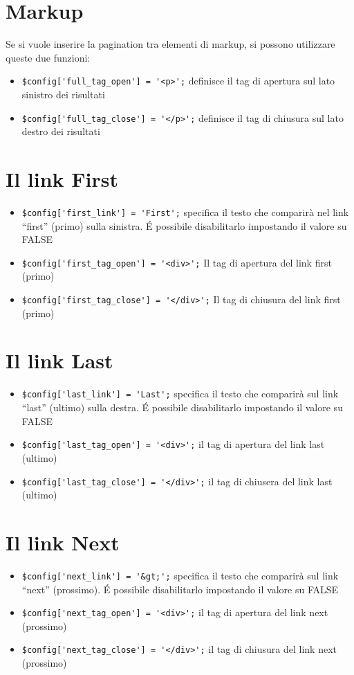 \section*{Markup}
Se si vuole inserire la pagination tra elementi di markup, si possono utilizzare queste due funzioni:

\begin{itemize}
\item \verb|$config['full_tag_open'] = '<p>';| definisce il tag di apertura sul lato sinistro dei risultati
\item \verb|$config['full_tag_close'] = '</p>';| definisce il tag di chiusura sul lato destro dei risultati
\end{itemize}

\section*{Il link First}
\begin{itemize}
\item \verb|$config['first_link'] = 'First';| specifica il testo che comparirà nel link ``first'' (primo) sulla sinistra. \'E possibile disabilitarlo impostando il valore su FALSE
\item \verb|$config['first_tag_open'] = '<div>';| Il tag di apertura del link first (primo)
\item \verb|$config['first_tag_close'] = '</div>';| Il tag di chiusura del link first (primo)
\end{itemize}

\section*{Il link Last}
\begin{itemize}
\item \verb|$config['last_link'] = 'Last';| specifica il testo che comparirà  sul link ``last'' (ultimo) sulla destra. \'E possibile disabilitarlo impostando il valore su FALSE
\item \verb|$config['last_tag_open'] = '<div>';| il tag di apertura del link last (ultimo)
\item \verb|$config['last_tag_close'] = '</div>';| il tag di chiusera del link last (ultimo)
\end{itemize}

\section*{Il link Next}
\begin{itemize}
\item \verb|$config['next_link'] = '&gt;';| specifica il testo che comparirà  sul link ``next'' (prossimo). \'E possibile disabilitarlo impostando il valore su FALSE
\item \verb|$config['next_tag_open'] = '<div>';| il tag di apertura del link next (prossimo)
\item \verb|$config['next_tag_close'] = '</div>';| il tag di chiusura del link next (prossimo)
\end{itemize}

